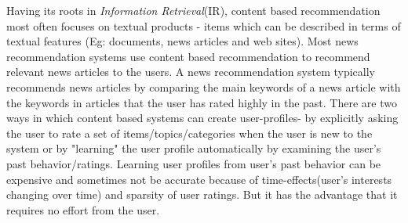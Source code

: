 Having its roots in \textit{Information Retrieval}(IR), content based recommendation most often focuses on textual products - items which can be described in terms of textual features (Eg: documents, news articles and web sites).
Most news recommendation systems use content based recommendation to recommend relevant news articles to the users.
A news recommendation system typically recommends news articles by comparing the main keywords of a news article with the keywords in articles that the user has rated highly in the past.
There are two ways in which content based systems can create user-profiles- 
by explicitly asking the user to rate a set of items/topics/categories when the user is new to the system
or by "learning" the user profile automatically by examining the user's past behavior/ratings.
Learning user profiles from user's past behavior can be expensive and sometimes not be accurate because of time-effects(user's interests changing over time) and sparsity of user ratings.
But it has the advantage that it requires no effort from the user.

